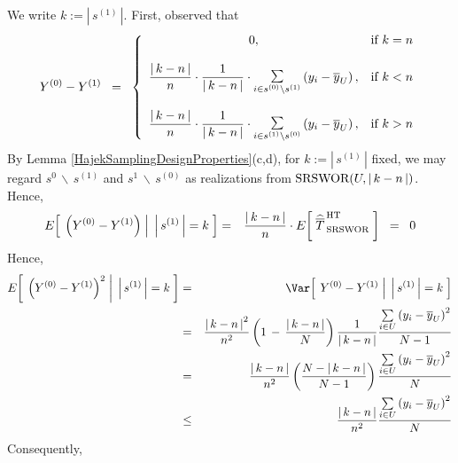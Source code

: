 \proof
We write $k := \left\vert\,s^{(1)}\,\right\vert$.
First, observed that
\begin{equation*}
Y^{(0)} - Y^{(1)}
\;\; = \;\;
\left\{
\begin{array}{cl}
0, & \textnormal{if $k = n$}
\\ \\
\dfrac{\vert\,k-n\,\vert}{n}\cdot
\dfrac{1}{\vert\,k-n\,\vert}\cdot
\underset{i\in s^{(0)} \backslash s^{(1)}}{\textnormal{\Large$\sum$}}\left(y_{i} - \overline{y}_{U}\right), & \textnormal{if $k < n$}
\\ \\
\dfrac{\vert\,k-n\,\vert}{n}\cdot
\dfrac{1}{\vert\,k-n\,\vert}\cdot
\underset{i\in s^{(1)} \backslash s^{(0)}}{\textnormal{\Large$\sum$}}\left(y_{i} - \overline{y}_{U}\right), & \textnormal{if $k > n$}
\end{array}
\right.
\end{equation*}
By Lemma \ref{HajekSamplingDesignProperties}(c,d), for $k := \left\vert\,s^{(1)}\,\right\vert$ fixed,
we may regard $s^{0}\,\backslash\,s^{(1)}$ and $s^{1}\,\backslash\,s^{(0)}$ as realizations
from $\textnormal{SRSWOR}(U,\vert\,k-n\,\vert)$.
Hence,
\begin{eqnarray*}
E\!\left[\;\left.\left(Y^{(0)} - Y^{(1)}\right)\;\right\vert\;\left\vert\,s^{(1)}\,\right\vert = k\;\right]
&=& \dfrac{\vert\,k-n\,\vert}{n}\cdot E\!\left[\;\widehat{\overline{T}}^{\mbox{}\,\textnormal{HT}}_{\mbox{}\,\textnormal{SRSWOR}}\;\right]
\;\;=\;\; 0
\end{eqnarray*}
Hence,
\begin{eqnarray*}
E\!\left[\;\left.\left(Y^{(0)} - Y^{(1)}\right)^{2}\;\right\vert\;\left\vert\,s^{(1)}\,\right\vert = k\;\right]
&=& \Var\!\left[\;\left.Y^{(0)} - Y^{(1)}\;\right\vert\;\left\vert\,s^{(1)}\,\right\vert = k\;\right]
\\
&=&
\dfrac{\left\vert\,k - n\,\right\vert^{2}}{n^{2}}
\left(1\,-\,\dfrac{\vert\,k-n\,\vert}{N}\right)
\dfrac{1}{\vert\,k-n\,\vert}
\dfrac{\underset{i\in U}{\sum}\left(y_{i}-\overline{y}_{U}\right)^{2}}{N-1}
\\
&=&
\dfrac{\left\vert\,k - n\,\right\vert}{n^{2}}
\left(\dfrac{N - \vert\,k-n\,\vert}{N - 1}\right)
\dfrac{\underset{i\in U}{\sum}\left(y_{i}-\overline{y}_{U}\right)^{2}}{N}
\\
&\leq&
\dfrac{\left\vert\,k - n\,\right\vert}{n^{2}}
\dfrac{\underset{i\in U}{\sum}\left(y_{i}-\overline{y}_{U}\right)^{2}}{N}
\end{eqnarray*}
Consequently,
